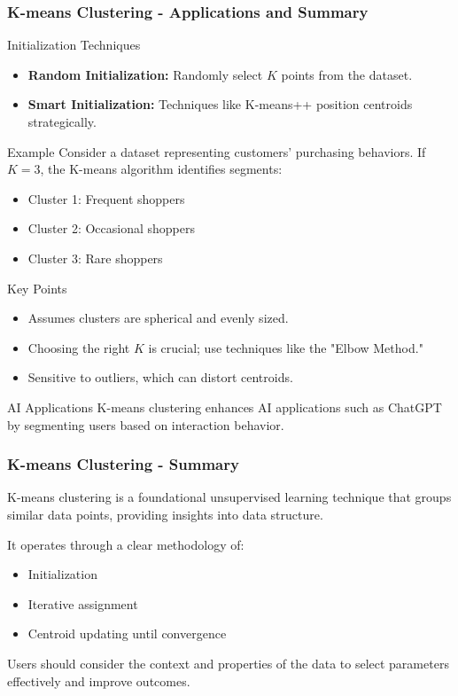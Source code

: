 \documentclass[aspectratio=169]{beamer}
\begin{document}
\begin{frame}[fragile]
    \frametitle{K-means Clustering - Applications and Summary}
    \begin{block}{Initialization Techniques}
        \begin{itemize}
            \item \textbf{Random Initialization:} Randomly select \(K\) points from the dataset.
            \item \textbf{Smart Initialization:} Techniques like K-means++ position centroids strategically.
        \end{itemize}
    \end{block}

    \begin{block}{Example}
        Consider a dataset representing customers' purchasing behaviors. If \(K = 3\), the K-means algorithm identifies segments:
        \begin{itemize}
            \item Cluster 1: Frequent shoppers
            \item Cluster 2: Occasional shoppers
            \item Cluster 3: Rare shoppers
        \end{itemize}
    \end{block}

    \begin{block}{Key Points}
        \begin{itemize}
            \item Assumes clusters are spherical and evenly sized.
            \item Choosing the right \(K\) is crucial; use techniques like the "Elbow Method."
            \item Sensitive to outliers, which can distort centroids.
        \end{itemize}
    \end{block}

    \begin{block}{AI Applications}
        K-means clustering enhances AI applications such as ChatGPT by segmenting users based on interaction behavior.
    \end{block}
\end{frame}

\begin{frame}[fragile]
    \frametitle{K-means Clustering - Summary}
    K-means clustering is a foundational unsupervised learning technique that groups similar data points, providing insights into data structure. 

    It operates through a clear methodology of:
    \begin{itemize}
        \item Initialization
        \item Iterative assignment
        \item Centroid updating until convergence
    \end{itemize}
    
    Users should consider the context and properties of the data to select parameters effectively and improve outcomes.
\end{frame}
\end{document}
